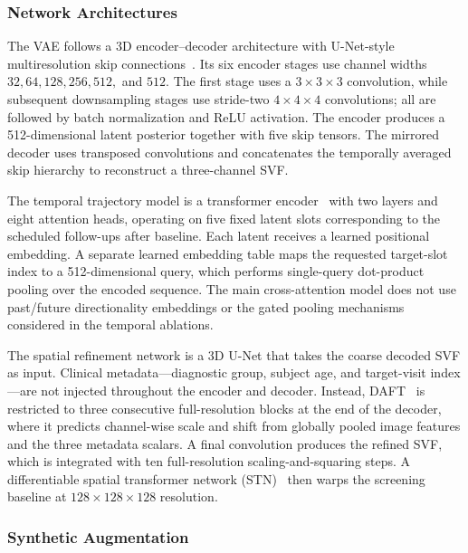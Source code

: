 \subsubsection*{Network Architectures}

The VAE follows a 3D encoder--decoder architecture with U-Net-style multiresolution skip connections~\cite{ronneberger2015unet}. Its six encoder stages use channel widths $32,64,128,256,512,$ and $512$. The first stage uses a $3\times3\times3$ convolution, while subsequent downsampling stages use stride-two $4\times4\times4$ convolutions; all are followed by batch normalization and ReLU activation. The encoder produces a 512-dimensional latent posterior together with five skip tensors. The mirrored decoder uses transposed convolutions and concatenates the temporally averaged skip hierarchy to reconstruct a three-channel SVF.

The temporal trajectory model is a transformer encoder~\cite{vaswani2017attention} with two layers and eight attention heads, operating on five fixed latent slots corresponding to the scheduled follow-ups after baseline. Each latent receives a learned positional embedding. A separate learned embedding table maps the requested target-slot index to a 512-dimensional query, which performs single-query dot-product pooling over the encoded sequence. The main cross-attention model does not use past/future directionality embeddings or the gated pooling mechanisms considered in the temporal ablations.

The spatial refinement network is a 3D U-Net that takes the coarse decoded SVF as input. Clinical metadata---diagnostic group, subject age, and target-visit index---are not injected throughout the encoder and decoder. Instead, DAFT~\cite{wolf2022daft} is restricted to three consecutive full-resolution blocks at the end of the decoder, where it predicts channel-wise scale and shift from globally pooled image features and the three metadata scalars. A final convolution produces the refined SVF, which is integrated with ten full-resolution scaling-and-squaring steps. A differentiable spatial transformer network (STN)~\cite{jaderberg2015spatial} then warps the screening baseline at $128\times128\times128$ resolution.

\subsubsection*{Synthetic Augmentation}

